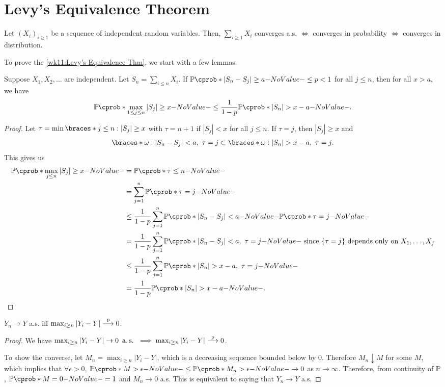 \documentclass[12pt]{article}
\begin{document}
\section{Levy's Equivalence Theorem}

\begin{Theorem}\label{wk11:Levy's Equivalence Thm}
Let $(X_i)_{i\geq1}$ be a sequence of independent random variables. Then, $\sum_{i \geq 1} X_i$ converges a.s. $\iff$ converges in probability $\iff$ converges in distribution.
\end{Theorem}

To prove the \cref{wk11:Levy's Equivalence Thm}, we start with a few lemmas.


\begin{Lemma}\label{wk11:lem:Kolineq}
Suppose $X_1,X_2,\ldots$ are independent. Let $S_n=\sum_{i\leq n} X_i$. If $\P(|S_n-S_j|\geq a) \leq p < 1$ for all $j\leq n$, then for all $x > a$, we have
\begin{align*}
\P(\max_{1\leq j\leq n} |S_j| \geq x) \leq \ofrac{1-p} \P(|S_n| > x-a).
\end{align*}
\end{Lemma}
\begin{proof}
Let $\tau = \min\braces*{j\leq n : |S_j|\geq x}$ with $\tau=n+1$ if $|S_j| < x$ for all $j\leq n$. If $\tau=j$, then $|S_j|\geq x$ and 
\begin{align*}
\braces*{\omega : |S_n - S_j| < a,\ \tau=j} \subset \braces*{\omega : |S_n| >x-a,\ \tau=j}.
\end{align*}
This gives us
\begin{align*}
\P(\max_{j\leq n}|S_j| \geq x)
&=\P(\tau\leq n)\\
&=\sum_{j=1}^n \P(\tau=j)\\
&\leq \ofrac{1-p}\sum_{j=1}^n \P(|S_n-S_j|<a)\P(\tau=j)\\
&=\ofrac{1-p}\sum_{j=1}^n \P(|S_n-S_j|<a,\ \tau=j) \text{ since $\{\tau=j\}$ depends only on $X_1,\ldots,X_j$} \\
&\leq \ofrac{1-p}\sum_{j=1}^n \P(|S_n|>x-a,\ \tau=j)\\
&= \ofrac{1-p}\P(|S_n|>x-a).
\end{align*}
\end{proof}

\begin{Lemma}\label{wk11:lem:asiffmaxconvp}
$Y_n\to Y$ a.s. iff $\max_{i\geq n} |Y_i-Y| \stackrel{\mathrm{p}}{\longrightarrow} 0$.
\end{Lemma}
\begin{proof}
We have $\max_{i\geq n} |Y_i-Y| \to 0\ \operatorname{a.s.}\ \implies \max_{i\geq n} |Y_i-Y| \stackrel{\mathrm{p}}{\longrightarrow} 0$.

To show the converse, let $M_n = \max_{i\geq n} |Y_i-Y|$, which is a decreasing sequence bounded below by 0. Therefore $M_n \downarrow M$ for some $M$, which implies that $\forall \epsilon>0$, $\P(M>\epsilon) \leq \P(M_n>\epsilon) \to 0$ as $n\to\infty$. Therefore, from continuity of $\P$, $\P(M=0)=1$ and $M_n\to 0$ a.s. This is equivalent to saying that $Y_n\to Y$ a.s.
\end{proof}
\end{document}
